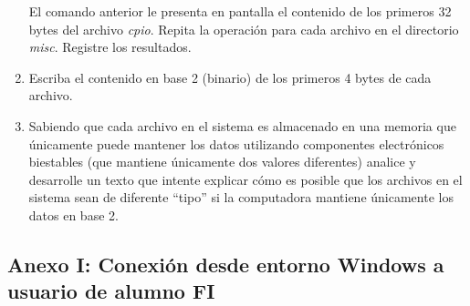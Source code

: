 \documentclass[12pt]{article}
\begin{document}
\begin{enumerate}
        El comando anterior le presenta en pantalla el contenido de los
        primeros 32 bytes del archivo \emph{cpio}. Repita la operación para
        cada archivo en el directorio \emph{misc}. Registre los resultados.

    \item Escriba el contenido en base 2 (binario) de los primeros 4 bytes de
        cada archivo.

    \item Sabiendo que cada archivo en el sistema es almacenado en una memoria
        que únicamente puede mantener los datos utilizando componentes
        electrónicos biestables (que mantiene únicamente dos valores
        diferentes) analice y desarrolle un texto que intente explicar cómo es
        posible que los archivos en el sistema sean de diferente ``tipo'' si
        la computadora mantiene únicamente los datos en base 2.

\end{enumerate}

\clearpage
\subsection{Anexo I: Conexión desde entorno Windows a usuario de alumno FI}
\label{subsec:anexoI}
\end{document}
